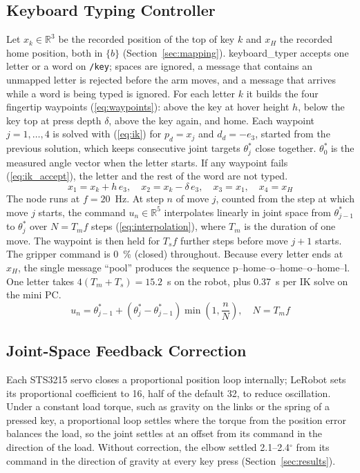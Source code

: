 \documentclass[letterpaper, 10 pt, conference]{ieeeconf}
\begin{document}
\subsection{Keyboard Typing Controller}
\label{sec:typing}
Let $x_k \in \mathbb{R}^3$ be the recorded position of the top of key $k$ and $x_H$ the recorded home
position, both in $\{b\}$ (Section~\ref{sec:mapping}). keyboard\_typer accepts one letter or a word on
\texttt{/key}; spaces are ignored, a message that contains an unmapped letter is rejected before the arm
moves, and a message that arrives while a word is being typed is ignored. For each letter $k$ it builds the
four fingertip waypoints (\ref{eq:waypoints}): above the key at hover height $h$, below the key top at press
depth $\delta$, above the key again, and home. Each waypoint $j = 1,\dots,4$ is solved with (\ref{eq:ik})
for $p_d = x_j$ and $d_d = -e_3$, started from the previous solution, which keeps consecutive joint
targets $\theta_j^{*}$ close together. $\theta_0^{*}$ is the measured angle vector when the letter starts.
If any waypoint fails (\ref{eq:ik_accept}), the letter and the rest of the word are not typed.
\begin{equation}
x_1 = x_k + h\,e_3, \quad x_2 = x_k - \delta\,e_3, \quad x_3 = x_1, \quad x_4 = x_H
\label{eq:waypoints}
\end{equation}
The node runs at $f = 20$~Hz. At step $n$ of move $j$, counted from the step at which move $j$ starts, the
command $u_n \in \mathbb{R}^5$ interpolates linearly in joint space from $\theta_{j-1}^{*}$ to
$\theta_j^{*}$ over $N = T_m f$ steps (\ref{eq:interpolation}), where $T_m$ is the duration of one move.
The waypoint is then held for $T_s f$ further steps before move $j+1$ starts. The gripper command is 0~\%
(closed) throughout. Because every letter ends at $x_H$, the single message ``pool'' produces the sequence
p--home--o--home--o--home--l. One letter takes $4(T_m + T_s) = 15.2$~s on the robot, plus 0.37~s per IK
solve on the mini PC.
\begin{equation}
u_n = \theta_{j-1}^{*} + \left(\theta_j^{*} - \theta_{j-1}^{*}\right) \min\!\left(1, \frac{n}{N}\right),
\quad N = T_m f
\label{eq:interpolation}
\end{equation}

\subsection{Joint-Space Feedback Correction}
\label{sec:feedback}
Each STS3215 servo closes a proportional position loop internally; LeRobot sets its proportional coefficient
to 16, half of the default 32, to reduce oscillation. Under a constant load torque, such as gravity on the
links or the spring of a pressed key, a proportional loop settles where the torque from the position error
balances the load, so the joint settles at an offset from its command in the direction of the load. Without
correction, the elbow settled 2.1--2.4$^\circ$ from its command in the direction of gravity at every key press
(Section~\ref{sec:results}).
\end{document}

